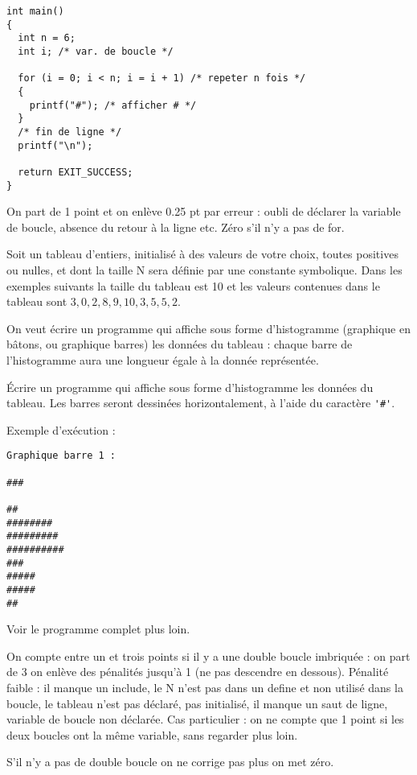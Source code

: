 \begin{correction}
\begin{verbatim}
int main()
{
  int n = 6;
  int i; /* var. de boucle */

  for (i = 0; i < n; i = i + 1) /* repeter n fois */
  {
    printf("#"); /* afficher # */
  }
  /* fin de ligne */
  printf("\n");

  return EXIT_SUCCESS;
}
\end{verbatim}
\end{correction}

\begin{baremeenv}
  On part de 1 point et on enlève 0.25 pt par erreur : oubli de déclarer la variable de boucle, absence du retour à la ligne etc. Zéro s'il n'y a pas de for.
\end{baremeenv}

\medskip
Soit un tableau d'entiers, initialisé à des valeurs de votre choix, toutes positives ou nulles, et dont la taille N sera définie par une constante symbolique. Dans les exemples suivants la taille du tableau est 10 et les valeurs contenues dans le tableau sont $3,0,2,8,9,10,3,5,5,2$.

On veut écrire un programme qui affiche sous forme d'histogramme (graphique en bâtons, ou graphique barres) les données du tableau : chaque barre de l'histogramme aura une longueur égale à la donnée représentée.

\question
Écrire un programme qui affiche sous forme d'histogramme les données du tableau. Les barres seront dessinées horizontalement, à l'aide du caractère \verb+'#'+. 

Exemple d'exécution :
\begin{small}
\begin{verbatim}
Graphique barre 1 :

###

##
########
#########
##########
###
#####
#####
##
\end{verbatim}
\end{small}


\begin{correction}
Voir le programme complet plus loin.
\end{correction}
\begin{baremeenv}
   On compte entre un et trois points si il y a une double boucle imbriquée : on part de 3 on enlève des pénalités jusqu'à 1 (ne pas descendre en dessous). Pénalité faible : il manque un include,  le N n'est pas dans un define et non utilisé dans la boucle, le tableau n'est pas déclaré, pas initialisé, il manque un saut de ligne, variable de boucle non déclarée. Cas particulier : on ne compte que 1 point si les deux boucles ont la même variable, sans regarder plus loin.

S'il n'y a pas de double boucle on ne corrige pas plus on met zéro.
\end{baremeenv}

